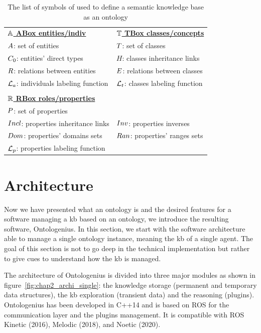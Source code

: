 \begin{table}[ht!]
\caption{The list of symbols of used to define a semantic knowledge base as an ontology }
\label{tab:onto_symboles}
\begin{tabular}{ll}
{\ul \textbf{$\mathbb{A}$ ABox entities/indiv}} & {\ul \textbf{$\mathbb{T}$ TBox classes/concepts}}  \\
$A$: set of entities               & $T$: set of classes  \\
$C_0$: entities' direct types        & $H$: classes inheritance links \\
$R$: relations between entities    & $E$: relations between classes  \\
$\mathcal{L}_a$: individuals labeling function & $\mathcal{L}_t$: classes labeling function \\
 & \\
\multicolumn{2}{l}{{\ul \textbf{$\mathbb{R}$ RBox roles/properties}}}                          \\
$P$: set of properties              &                                              \\
$Incl$: properties inheritance links       & $Inv$: properties inverses                   \\
$Dom$: properties' domains sets     & $Ran$: properties' ranges sets   \\
$\mathcal{L}_p$: properties labeling function & \\
\end{tabular}
\end{table}

\section{Architecture}

Now we have presented what an ontology is and the desired features for a software managing a \acrfull{kb} based on an ontology, we introduce the resulting software, Ontologenius. In this section, we start with the software architecture able to manage a single ontology instance, meaning the \acrshort{kb} of a single agent. The goal of this section is not to go deep in the technical implementation but rather to give cues to understand how the \acrshort{kb} is managed.

The architecture of Ontologenius is divided into three major modules as shown in figure~\ref{fig:chap2_archi_single}: the knowledge storage (permanent and temporary data structures), the \acrshort{kb} exploration (transient data) and the reasoning (plugins). Ontologenius has been developed in C++14 and is based on ROS for the communication layer and the plugins management. It is compatible with ROS Kinetic (2016), Melodic (2018), and Noetic (2020). 

